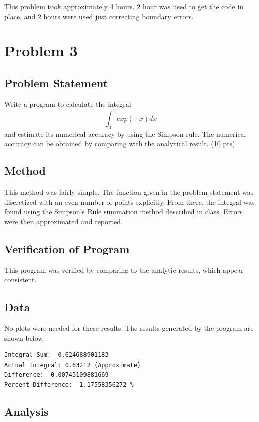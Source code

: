 \documentclass[10pt,letter]{article}
\begin{document}
This problem took approximately 4 hours. 2 hour was used to get the code in place, and 2 hours were used just correcting boundary errors.

\pagebreak

\section{Problem 3}

\subsection{Problem Statement}

Write a program to calculate the integral
$$ \int_0^1 exp(-x) dx$$
and estimate its numerical accuracy by using the Simpson rule. The numerical accuracy can be
obtained by comparing with the analytical result. (10 pts)

\subsection{Method}

This method was fairly simple. The function given in the problem statement was discretized with an even number of points explicitly. From there, the integral was found using the Simpson's Rule summation method described in class. Errors were then approximated and reported.

\subsection{Verification of Program}

This program was verified by comparing to the analytic results, which appear consistent.

\subsection{Data}

No plots were needed for these results. The results generated by the program are shown below:

\begin{verbatim}
Integral Sum:  0.624688901183
Actual Integral: 0.63212 (Approximate)
Difference:  0.00743109881669
Percent Difference:  1.17558356272 %
\end{verbatim}

\subsection{Analysis}
\end{document}
